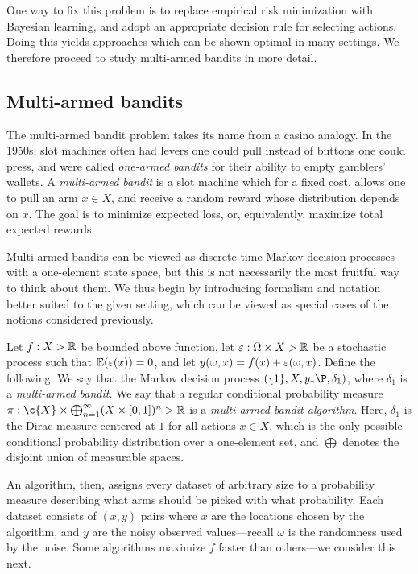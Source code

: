 \documentclass[11pt]{book}
\begin{document}
One way to fix this problem is to replace empirical risk minimization with Bayesian learning, and adopt an appropriate decision rule for selecting actions.
Doing this yields approaches which can be shown optimal in many settings.
We therefore proceed to study multi-armed bandits in more detail.

\subsection{Multi-armed bandits}

The multi-armed bandit problem takes its name from a casino analogy.
In the 1950s, slot machines often had levers one could pull instead of buttons one could press, and were called \emph{one-armed bandits} for their ability to empty gamblers' wallets.
A \emph{multi-armed bandit} is a slot machine which for a fixed cost, allows one to pull an arm $x \in X$, and receive a random reward whose distribution depends on $x$.
The goal is to minimize  expected loss, or, equivalently, maximize total expected rewards.

Multi-armed bandits can be viewed as discrete-time Markov decision processes with a one-element state space, but this is not necessarily the most fruitful way to think about them.
We thus begin by introducing formalism and notation better suited to the given setting, which can be viewed as special cases of the notions considered previously.

\begin{definition}
Let $f : X \-> \mathbb{R}$ be bounded above function, let $\varepsilon : \Omega \times X \-> \mathbb{R}$ be a stochastic process such that $\operatorname{\mathbb{E}}(\varepsilon(x)) = 0$, and let $y(\omega,x) = f(x) + \varepsilon(\omega,x)$.
Define the following.
\1 We say that the Markov decision process $(\{1\},X,y_*\P,\delta_{1})$, where $\delta_1$ is a \emph{multi-armed bandit}.
\2 We say that a regular conditional probability measure  $\pi : \c{X} \x \bigoplus_{n=1}^\infty (X \x [0,1])^n \-> \R$ is a \emph{multi-armed bandit algorithm}.
\0
Here, $\delta_1$ is the Dirac measure centered at $1$ for all actions $x\in X$, which is the only possible conditional probability distribution over a one-element set, and $\bigoplus$ denotes the disjoint union of measurable spaces.
\end{definition}

An algorithm, then, assigns every dataset of arbitrary size to a probability measure describing what arms should be picked with what probability.
Each dataset consists of $(x, y)$ pairs where $x$ are the locations chosen by the algorithm, and $y$ are the noisy observed values---recall $\omega$ is the randomness used by the noise.
Some algorithms maximize $f$ faster than others---we consider this next.
\end{document}
